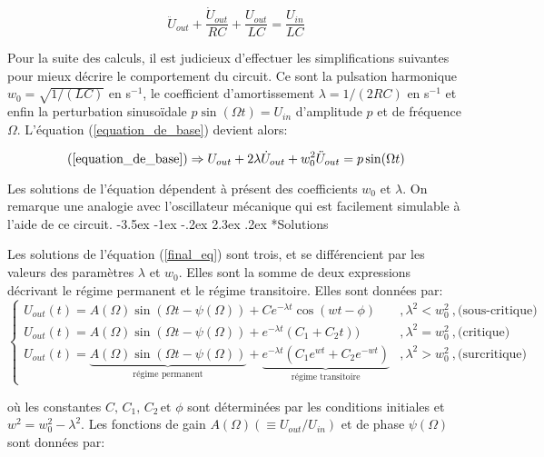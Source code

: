 \documentclass[a4paper, 12pt,oneside]{article}
\makeatletter
\renewcommand{\subsection}{\@startsection {subsection}{1}{\z@}%
             {-3.5ex \@plus -1ex \@minus -.2ex}%
             {2.3ex \@plus.2ex}%
             {\normalfont\normalsize\bfseries}}
\makeatother
\begin{document}
\begin{equation}
    \ddot{U}_{out}+\frac{\dot{U}_{out}}{RC}+\frac{U_{out}}{LC} = \frac{U_{in}}{LC}
    \label{equation_de_base}
\end{equation}

Pour la suite des calculs, il est judicieux d'effectuer les simplifications suivantes pour mieux décrire le comportement du circuit. Ce sont la pulsation harmonique $w_0 = \sqrt{1/(LC)}$ en s$^{-1}$,  le coefficient d'amortissement $\lambda = 1/(2RC)$ en s$^{-1}$ et enfin la perturbation sinusoïdale $p\sin(\Omega t) = U_{in}$ d'amplitude $p$ et de fréquence $\Omega$. L'équation (\ref{equation_de_base}) devient alors:

\begin{equation}
    (\ref{equation_de_base}) \Rightarrow U_{out}+2\lambda\dot{U}_{out}+w_0^2\ddot{U}_{out}=p\sin(\Omega t)
    \label{final_eq}
\end{equation}

Les solutions de l'équation dépendent à présent des coefficients $w_0$ et $\lambda$. On remarque une analogie avec l'oscillateur mécanique qui est facilement simulable à l'aide de ce circuit.
\subsection*{Solutions}

Les solutions de l'équation (\ref{final_eq}) sont trois, et se différencient par les valeurs des paramètres $\lambda$ et $w_0$. Elles sont la somme de deux expressions décrivant le régime permanent et le régime transitoire. Elles sont données par:
\begin{equation}
\left\{\begin{array}{ll}
U_{out}(t) = A(\Omega)\sin(\Omega t-\psi (\Omega))+Ce^{-\lambda t}\cos(wt-\phi) & ,\lambda^2 < w_0^2 \ ,\text{(sous-critique)}\\
U_{out}(t) = A(\Omega)\sin(\Omega t-\psi (\Omega))+e^{-\lambda t}(C_1+C_2t)) & ,\lambda^2=w_0^2 \ ,\text{(critique)}\\
U_{out}(t) = \underbrace{A(\Omega)\sin(\Omega t-\psi (\Omega))}_{\text{régime permanent}}+\underbrace{e^{-\lambda t}(C_1 e^{w t}+C_2 e^{-w t})}_{\text{régime transitoire}} & , \lambda^2 > w_0^2 \ ,\text{(surcritique)}
\end{array}
\right.
\label{eq_boss}
\end{equation}

où les constantes $C,\, C_1,\, C_2\, \text{et } \phi$ sont déterminées par les conditions initiales et $w^2 = w_0^2 -\lambda^2$. Les fonctions de gain $A(\Omega) (\equiv U_{out}/U_{in})$ et de phase $\psi(\Omega)$ sont données par:
\end{document}
